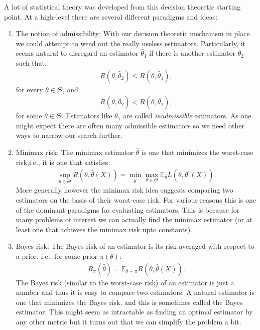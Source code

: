 \documentclass[twoside,12pt]{article}
\begin{document}
A lot of statistical theory was developed from this decision theoretic starting point. 
At a high-level there are several different paradigms and ideas:
\begin{enumerate}
\item The notion of admissibility: With our decision theoretic mechanism in place we could attempt
to weed out the really useless estimators. 
Particularly, it seems natural to disregard an estimator $\widehat{\theta}_1$ if there
is another estimator $\widehat{\theta}_2$ such that,
\begin{align*}
R(\theta, \widehat{\theta}_2) \leq R(\theta, \widehat{\theta}_1),
\end{align*}
for every $\theta \in \Theta$, and 
\begin{align*}
R(\theta, \widehat{\theta}_2) < R(\theta, \widehat{\theta}_1),
\end{align*}
for some $\theta \in \Theta$. Estimators like $\theta_1$ are called \emph{inadmissible} estimators.
As one might expect there are often many admissible estimators so we need other ways to narrow
our search further.

\item Minimax risk: The minimax estimator $\widehat{\theta}$ is one that minimizes the worst-case risk,i.e.,
it is one that satisfies:
\begin{align*}
\sup_{\theta \in \Theta} R(\theta,\widehat{\theta}(X)) =  \min_{\theta^{\prime}} \max_{\theta \in \Theta} \mathbb{E}_{\theta} L(\theta,\theta^{\prime}(X)).
\end{align*}
More generally however the minimax risk idea suggests comparing two estimators
on the basis of their worst-case risk. 
For various reasons this is one of the dominant paradigms for evaluating estimators. This is because for many problems of interest we can actually find the minimax estimator (or at least one that achieves the minimax risk upto constants).

\item Bayes risk: The Bayes risk of an estimator is its risk averaged with respect to a prior, i.e.,
for some prior $\pi(\theta)$:
\begin{align*}
R_{\pi}(\widehat{\theta}) = \mathbb{E}_{\theta \sim \pi} R(\theta,\widehat{\theta}(X)).
\end{align*}
The Bayes risk (similar to the worst-case risk) 
of an estimator is just a number and thus it is easy to compare two estimators.
A natural estimator is one that minimizes the Bayes risk, and this is sometimes
called the Bayes estimator. This might seem as intractable as finding an optimal estimator by any other metric but it turns out that we can simplify the problem a bit. 


\end{enumerate}
\end{document}
